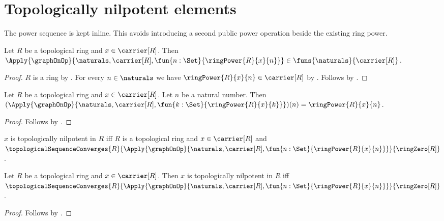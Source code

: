 



\section{Topologically nilpotent elements}

The power sequence is kept inline.  This avoids introducing a second public
power operation beside the existing ring power.

\begin{proposition}\label{topological_ring_power_sequence_type}
    Let $R$ be a topological ring and $x\in\carrier[R]$.
    Then
        $\Apply{\graphOnOp}{
            \naturals,\carrier[R],
            \fun{n:\Set}{\ringPower{R}{x}{n}}}
        \in\funs{\naturals}{\carrier[R]}$.
\end{proposition}
\begin{proof}
    $R$ is a ring by .
    For every $n\in\naturals$ we have
        $\ringPower{R}{x}{n}\in\carrier[R]$ by .
    Follows by .
\end{proof}

\begin{proposition}\label{topological_ring_power_sequence_apply}
    Let $R$ be a topological ring and $x\in\carrier[R]$.
    Let $n$ be a natural number.
    Then
        $(\Apply{\graphOnOp}{
            \naturals,\carrier[R],
            \fun{k:\Set}{\ringPower{R}{x}{k}}})(n)
        =\ringPower{R}{x}{n}$.
\end{proposition}
\begin{proof}
    Follows by .
\end{proof}

\begin{definition}\label{topologically_nilpotent_element}
    $x$ is topologically nilpotent in $R$ iff
        $R$ is a topological ring and $x\in\carrier[R]$ and
        $\topologicalSequenceConverges{R}{
            \Apply{\graphOnOp}{
                \naturals,\carrier[R],
                \fun{n:\Set}{\ringPower{R}{x}{n}}}}{
            \ringZero[R]}$.
\end{definition}

\begin{proposition}\label{topologically_nilpotent_element_iff}
    Let $R$ be a topological ring and $x\in\carrier[R]$.
    Then $x$ is topologically nilpotent in $R$ iff
        $\topologicalSequenceConverges{R}{
            \Apply{\graphOnOp}{
                \naturals,\carrier[R],
                \fun{n:\Set}{\ringPower{R}{x}{n}}}}{
            \ringZero[R]}$.
\end{proposition}
\begin{proof}
    Follows by .
\end{proof}

